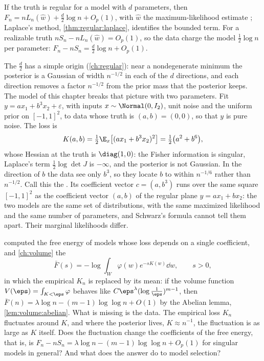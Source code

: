 \begin{refsection}
\begin{regularanswer}
If the truth is regular for a model with $d$ parameters, then $F_n=nL_n(\hat w)+\tfrac d2\log n+O_p(1)$, with $\hat w$ the maximum-likelihood estimate \parencite{Schwarz1978,Haughton1988}; Laplace's method, \cref{thm:regular:laplace}, identifies the bounded term. For a realizable truth $nS_n-nL_n(\hat w)=O_p(1)$, so the data charge the model $\tfrac12\log n$ per parameter: $F_n-nS_n=\tfrac d2\log n+O_p(1)$.
\end{regularanswer}

The $\tfrac d2$ has a simple origin (\cref{ch:regular}): near a nondegenerate minimum the posterior is a Gaussian of width $n^{-1/2}$ in each of the $d$ directions, and each direction removes a factor $n^{-1/2}$ from the prior mass that the posterior keeps. The model of this chapter breaks that picture with two parameters. Fit $y=ax_1+b^3x_2+\varepsilon$, with inputs $x\sim\Normal(0,I_2)$, unit noise and the uniform prior on $[-1,1]^2$, to data whose truth is $(a,b)=(0,0)$, so that $y$ is pure noise. The loss is
\[
K(a,b)=\tfrac12\E_x\bigl[(ax_1+b^3x_2)^2\bigr]=\tfrac12\bigl(a^2+b^6\bigr),
\]
whose Hessian at the truth is $\diag(1,0)$: the Fisher information is singular, Laplace's term $\tfrac12\log\det J$ is $-\infty$, and the posterior is not Gaussian. In the direction of $b$ the data see only $b^3$, so they locate $b$ to within $n^{-1/6}$ rather than $n^{-1/2}$. Call this the . Its coefficient vector $c=(a,b^3)$ runs over the same square $[-1,1]^2$ as the coefficient vector $(a,b)$ of the regular plane $y=ax_1+bx_2$: the two models are the same set of distributions, with the same maximized likelihood and the same number of parameters, and Schwarz's formula cannot tell them apart. Their marginal likelihoods differ.

 computed the free energy of models whose loss depends on a single coefficient, and \cref{ch:volume} the 
\[
\bar F(s)=-\log\int_W\varphi(w)e^{-sK(w)}\dd w ,\qquad s>0,
\]
in which the empirical $K_n$ is replaced by its mean: if the volume function $V(\eps)=\int_{K<\eps}\varphi$ behaves like $C\eps^\lambda(\log\frac1\eps)^{m-1}$, then $\bar F(n)=\lambda\log n-(m-1)\log\log n+O(1)$ by the Abelian lemma, \cref{lem:volume:abelian}. What is missing is the data. The empirical loss $K_n$ fluctuates around $K$, and where the posterior lives, $K\approx n^{-1}$, the fluctuation is as large as $K$ itself. Does the fluctuation change the coefficients of the free energy, that is, is $F_n-nS_n=\lambda\log n-(m-1)\log\log n+O_p(1)$ for singular models in general? And what does the answer do to model selection?


\end{refsection}
